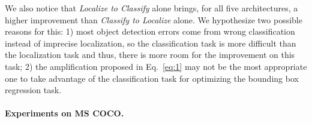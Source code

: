 \documentclass[runningheads]{llncs}
\begin{document}
We also notice that \emph{Localize to Classify} alone brings, for all five architectures, a higher improvement than \emph{Classify to Localize} alone. We hypothesize two possible reasons for this: 1) most object detection errors come from wrong classification instead of imprecise localization, so the classification task is more difficult than the localization task and thus, there is more room for the improvement on this task; 2) the amplification proposed in Eq.~\eqref{eq:1} may not be the most appropriate one to take advantage of the classification task for optimizing the bounding box regression task.

\paragraph{Experiments on MS COCO.}
\end{document}
